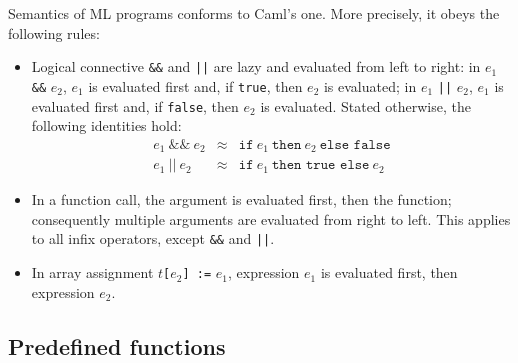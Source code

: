 \documentclass[a4paper,12pt]{report}
\newcommand{\caml}{\textsf{Caml}}
\newcommand{\te}[1]{\texttt{#1}}
\begin{document}
Semantics of ML programs conforms to \caml's one.
More precisely, it obeys the following rules:
\begin{itemize}
\item 
  Logical connective \texttt{\&\&} and \texttt{||} are lazy and
  evaluated from left to right: in $e_1$ \texttt{\&\&} $e_2$, $e_1$ is
  evaluated first and, if \texttt{true}, then $e_2$ is evaluated; in
  $e_1$ \texttt{||} $e_2$, $e_1$ is evaluated first and, if
  \texttt{false}, then $e_2$ is evaluated.
  Stated otherwise, the following identities hold:
  \begin{displaymath}
    \begin{array}{rcl}
      e_1 ~ \te{\&\&} ~ e_2 & \approx & 
      \te{if} ~ e_1 ~ \te{then} ~ e_2 ~ \te{else false} \\[0.5em]
      e_1 ~ \te{||} ~ e_2 & \approx & 
      \te{if} ~ e_1 ~ \te{then true else} ~ e_2
    \end{array}
  \end{displaymath}
\item
  In a function call, the argument is evaluated first, then the
  function; consequently multiple arguments are evaluated from right
  to left. This applies to all infix operators, except
  \texttt{\&\&} and \texttt{||}.
\item
  In array assignment $t$\texttt{[}$e_2$\texttt{] :=} $e_1$,
  expression $e_1$ is evaluated first, then expression $e_2$.
\end{itemize}


\subsection{Predefined functions}
\end{document}
